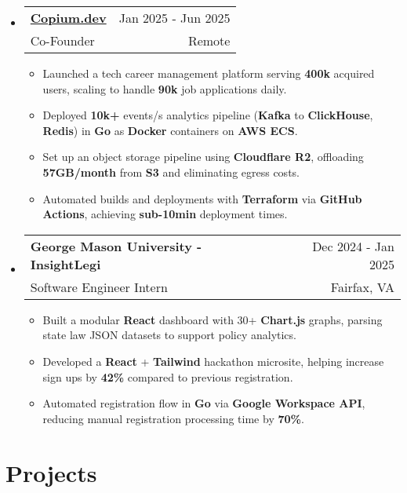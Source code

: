 \documentclass[letterpaper,11pt]{article}
\makeatletter
\newcommand{\resumeItem}[1]{
  \item{
    {#1}
  }
}
\newcommand{\resumeSubheading}[4]{
    \item
    \begin{tabular*}{0.985\textwidth}[t]{l@{\extracolsep{\fill}}r@{\hspace{-0.1in}}}
        {\textbf{#1}} & {#2} \\
        #3 &  #4 \\
    \end{tabular*}\vspace{-5pt}
}
\newcommand{\resumeSubHeadingListStart}{\begin{itemize}[leftmargin=0.00in, rightmargin=-0.2in, label={}]\vspace{3pt}}
\newcommand{\resumeSubHeadingListEnd}{\end{itemize}\vspace{-5pt}}
\newcommand{\resumeItemListStart}{\vspace{3pt}\begin{itemize}[leftmargin=0.15in, rightmargin=0.15in]}
\newcommand{\resumeItemListEnd}{\end{itemize}\vspace{-5pt}}
\makeatother
\begin{document}
\resumeSubHeadingListStart
\resumeSubheading
{\href{https://www.copium.dev}{Copium.dev}} {Jan 2025 - Jun 2025}
{Co-Founder} {Remote}
\resumeItemListStart
\resumeItem{Launched a tech career management platform serving \textbf{400k} acquired users, scaling to handle \textbf{90k} job applications daily.}
\resumeItem{Deployed \textbf{10k+} events/s analytics pipeline (\textbf{Kafka} to \textbf{ClickHouse}, \textbf{Redis}) in \textbf{Go} as \textbf{Docker} containers on \textbf{AWS ECS}.}
\resumeItem{Set up an object storage pipeline using \textbf{Cloudflare R2}, offloading \textbf{57GB/month} from \textbf{S3} and eliminating egress costs.}
\resumeItem{Automated builds and deployments with \textbf{Terraform} via \textbf{GitHub Actions}, achieving \textbf{sub-10min} deployment times.}
\resumeItemListEnd
\resumeSubHeadingListEnd

\resumeSubHeadingListStart
\resumeSubheading
{George Mason University - InsightLegi} {Dec 2024 - Jan 2025}
{Software Engineer Intern} {Fairfax, VA}
\resumeItemListStart
\resumeItem{Built a modular \textbf{React} dashboard with 30+ \textbf{Chart.js} graphs, parsing state law JSON datasets to support policy analytics.}
\resumeItem{Developed a \textbf{React} + \textbf{Tailwind} hackathon microsite, helping increase sign ups by \textbf{42\%} compared to previous registration.}
\resumeItem{Automated registration flow in \textbf{Go} via \textbf{Google Workspace API}, reducing manual registration processing time by \textbf{70\%}.}
\resumeItemListEnd
\resumeSubHeadingListEnd



\section{Projects}
\end{document}
